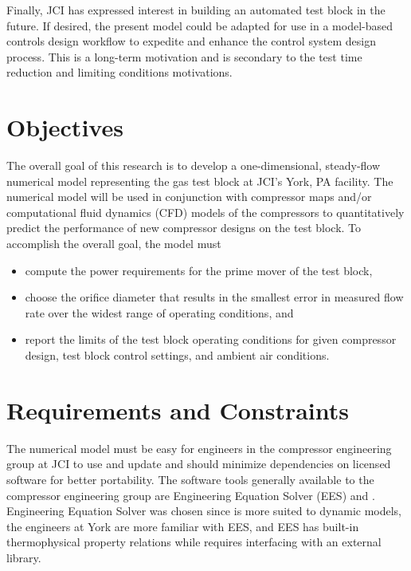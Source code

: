 Finally, JCI has expressed interest in building an automated test block in the future. 
If desired, the present model could be adapted for use in a model-based controls design workflow 
to expedite and enhance the control system design process. 
This is a long-term motivation and is secondary to the test time reduction and limiting conditions motivations.

\section{Objectives} \label{sec:objective}
The overall goal of this research is to develop a one-dimensional, steady-flow numerical model 
representing the  gas test block at JCI's York, PA facility. 
The numerical model will be used in conjunction with compressor maps and/or computational fluid dynamics (CFD)%
models of the compressors to quantitatively predict the performance of new compressor designs on the test block. 
To accomplish the overall goal, the model must
\begin{itemize}
  \item compute the power requirements for the prime mover of the test block,
  \item choose the orifice diameter that results in the smallest error in measured
    flow rate over the widest range of operating conditions, and 
  \item report the limits of the test block operating conditions for given compressor 
		design, test block control settings, and ambient air conditions.
\end{itemize}

\section{Requirements and Constraints} \label{sec:requirements}
The numerical model must be easy for engineers in the compressor engineering group at JCI 
to use and update and should minimize dependencies on licensed software for better portability. 
The software tools generally available to the compressor engineering group are 
Engineering Equation Solver (EES) and \MLS{}. 
Engineering Equation Solver was chosen since \MLS{} is more suited to dynamic models, 
the engineers at York are more familiar with EES, 
and EES has built-in thermophysical property relations 
while \MLS{} requires interfacing with an external library.

